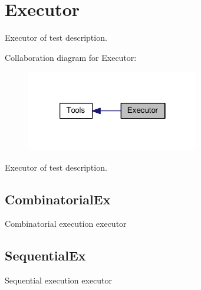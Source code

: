 \hypertarget{group__Executor}{\section{Executor}
\label{group__Executor}
}


Executor of test description.  


Collaboration diagram for Executor\-:
\nopagebreak
\begin{figure}[H]
\begin{center}
\leavevmode
\includegraphics[width=214pt]{group__Executor}
\end{center}
\end{figure}
Executor of test description. \hypertarget{group__Executor_CombinatorialEx}{}\subsection{Combinatorial\-Ex}\label{group__Executor_CombinatorialEx}
Combinatorial execution executor\hypertarget{group__Executor_SequentialEx}{}\subsection{Sequential\-Ex}\label{group__Executor_SequentialEx}
Sequential execution executor 
